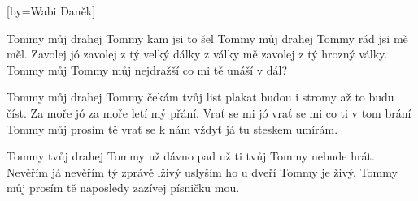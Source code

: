 [by={Wabi Daněk}]

\beginverse{}
Tommy můj drahej Tommy kam jsi to šel
Tommy můj drahej Tommy rád jsi mě měl.
Zavolej jó zavolej z tý velký dálky
z války mě zavolej z tý hrozný války.
Tommy můj Tommy můj nejdražší
co mi tě unáší v dál?
\endverse{}

\beginverse{}
\chordsoff{}
Tommy můj drahej Tommy čekám tvůj list
plakat budou i stromy až to budu číst.
Za moře jó za moře letí mý přání.
Vrať se mi jó vrať se mi co ti v tom brání
Tommy můj prosím tě vrať se k nám
vždyť já tu steskem umírám.
\chordson{}
\endverse{}

\beginverse{}
\chordsoff{}
Tommy tvůj drahej Tommy už dávno pad
už ti tvůj Tommy nebude hrát.
Nevěřím já nevěřím tý zprávě lživý
uslyším ho u dveří Tommy je živý.
Tommy můj prosím tě naposledy
zazívej písničku mou.
\chordson{}
\endverse{}

\endsong{}
